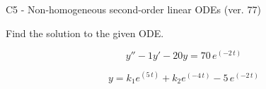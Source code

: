 \begin{exercise}
  \begin{exerciseTitle}C5 - Non-homogeneous second-order linear ODEs (ver. 77)\end{exerciseTitle}
  \begin{exerciseStatement}
    
Find the solution to the given ODE.

    
\[y''-1y'-20y = 70 \, e^{\left(-2 \, t\right)}\]

  \end{exerciseStatement}
  \begin{exerciseAnswer}
    
\[y= k_{1} e^{\left(5 \, t\right)} + k_{2} e^{\left(-4 \, t\right)} - 5 \, e^{\left(-2 \, t\right)}\]

  \end{exerciseAnswer}
\end{exercise}